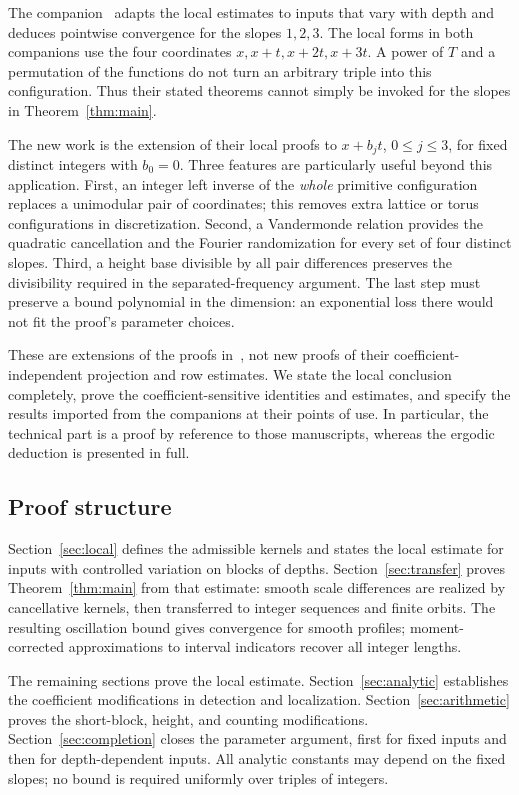 The companion~\cite{V} adapts the local estimates to inputs that vary
with depth and deduces pointwise convergence for the slopes $1,2,3$.
The local forms in both companions use the four coordinates
$x,x+t,x+2t,x+3t$. A power of $T$ and a permutation of the functions
do not turn an arbitrary triple into this configuration. Thus their
stated theorems cannot simply be invoked for the slopes in
Theorem~\ref{thm:main}.

The new work is the extension of their local proofs to
$x+b_jt$, $0\le j\le3$, for fixed distinct integers with $b_0=0$.
Three features are particularly useful beyond this application.
First, an integer left inverse of the \emph{whole} primitive
configuration replaces a unimodular pair of coordinates; this removes
extra lattice or torus configurations in discretization.
Second, a Vandermonde relation provides the quadratic cancellation and
the Fourier randomization for every set of four distinct slopes.
Third, a height base divisible by all pair differences preserves the
divisibility required in the separated-frequency argument. The last
step must preserve a bound polynomial in the dimension: an exponential
loss there would not fit the proof's parameter choices.

These are extensions of the proofs in~\cite{H,V}, not new proofs of
their coefficient-independent projection and row estimates. We state
the local conclusion completely, prove the coefficient-sensitive
identities and estimates, and specify the results imported from the
companions at their points of use. In particular, the technical part
is a proof by reference to those manuscripts, whereas the
ergodic deduction is presented in full.

\subsection{Proof structure}
Section~\ref{sec:local} defines the admissible kernels and states the
local estimate for inputs with controlled variation on blocks of
depths. Section~\ref{sec:transfer} proves Theorem~\ref{thm:main} from
that estimate: smooth scale differences are realized by cancellative
kernels, then transferred to integer sequences and finite orbits.
The resulting oscillation bound gives convergence for smooth profiles;
moment-corrected approximations to interval indicators recover all
integer lengths.

The remaining sections prove the local estimate. Section~\ref{sec:analytic}
establishes the coefficient modifications in detection and
localization. Section~\ref{sec:arithmetic} proves the short-block,
height, and counting modifications. Section~\ref{sec:completion}
closes the parameter argument, first for fixed inputs and then for
depth-dependent inputs. All analytic constants may depend on the fixed
slopes; no bound is required uniformly over triples of integers.
